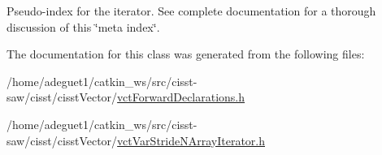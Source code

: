 Pseudo-\/index for the iterator. See complete documentation for a thorough discussion of this \char`\"{}meta index\char`\"{}. 

The documentation for this class was generated from the following files\-:\begin{DoxyCompactItemize}
\item 
/home/adeguet1/catkin\-\_\-ws/src/cisst-\/saw/cisst/cisst\-Vector/\hyperlink{vct_forward_declarations_8h}{vct\-Forward\-Declarations.\-h}\item 
/home/adeguet1/catkin\-\_\-ws/src/cisst-\/saw/cisst/cisst\-Vector/\hyperlink{vct_var_stride_n_array_iterator_8h}{vct\-Var\-Stride\-N\-Array\-Iterator.\-h}\end{DoxyCompactItemize}
